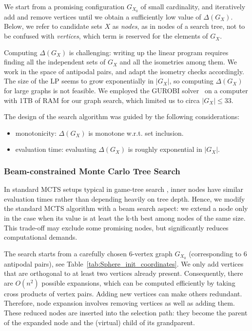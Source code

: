 \documentclass[11pt]{amsart}
\numberwithin{equation}{section}
\begin{document}
\medskip

We start from a promising configuration $G_{X_{0}}$ of small cardinality, and iteratively add and remove vertices until we obtain a sufficiently low value of $\Delta(G_X)$. Below, we refer to  candidate sets $X$ as \emph{nodes}, as in nodes of a search tree, not to be confused with \emph{vertices}, which term is reserved for the elements of $G_X$.

\medskip

Computing $\Delta(G_X)$ is challenging: writing up the linear program requires finding all the independent sets of $G_X$ and all the isometries among them. We work in the space of antipodal pairs, and adapt the isometry checks accordingly. The size of the LP seems to grow exponentially in $|G_X|$, so computing $\Delta(G_X)$ for large graphs is not feasible. We employed the GUROBI solver~\cite{gurobi} on a computer with 1TB of RAM for our graph search, which limited us to circa $|G_X| \leq 33$.

\medskip

The design of the search algorithm was guided by the following considerations:
\begin{itemize}
    \item monotonicity: $\Delta(G_X)$ is monotone w.r.t. set inclusion.
    \item evaluation time: evaluating $\Delta(G_X)$ is roughly exponential in $|G_X|$.
\end{itemize}


\subsubsection{Beam-constrained Monte Carlo Tree Search}

In standard MCTS setups typical in game-tree search \cite{coulom, kocsisszepesvari, silver}, inner nodes have similar evaluation times rather than depending heavily on tree depth.
Hence, we modify the standard MCTS algorithm with a beam search aspect: we extend a node only in the case when its value is at least the k-th best among nodes of the same size.
This trade-off may exclude some promising nodes, but significantly reduces computational demands.

The search starts from a carefully chosen 6-vertex graph $G_{X_0}$ (corresponding to 6 antipodal pairs), see Table~\ref{tab:Sphere_init_coordinates}. We only add vertices that are orthogonal to at least two vertices already present. Consequently, there are $O(n^2)$ possible expansions, which can be computed efficiently by taking cross products of vertex pairs.
Adding new vertices can make others redundant. Therefore, node expansion involves removing vertices as well as adding them. These reduced nodes are inserted into the selection path: they become the parent of the expanded node and the (virtual) child of its grandparent.
\end{document}
